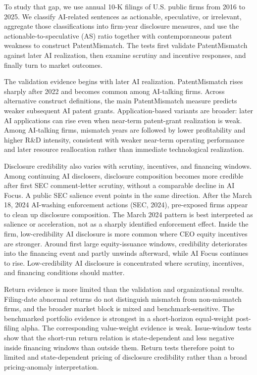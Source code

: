 To study that gap, we use annual 10-K filings of U.S. public firms from 2016 to 2025. We classify AI-related sentences as actionable, speculative, or irrelevant, aggregate those classifications into firm-year disclosure measures, and use the actionable-to-speculative (AS) ratio together with contemporaneous patent weakness to construct PatentMismatch. The tests first validate PatentMismatch against later AI realization, then examine scrutiny and incentive responses, and finally turn to market outcomes.

The validation evidence begins with later AI realization. PatentMismatch rises sharply after 2022 and becomes common among AI-talking firms. Across alternative construct definitions, the main PatentMismatch measure predicts weaker subsequent AI patent grants. Application-based variants are broader: later AI applications can rise even when near-term patent-grant realization is weak. Among AI-talking firms, mismatch years are followed by lower profitability and higher R\&D intensity, consistent with weaker near-term operating performance and later resource reallocation rather than immediate technological realization.

Disclosure credibility also varies with scrutiny, incentives, and financing windows. Among continuing AI disclosers, disclosure composition becomes more credible after first SEC comment-letter scrutiny, without a comparable decline in AI Focus. A public SEC salience event points in the same direction. After the March 18, 2024 AI-washing enforcement actions (SEC, 2024), pre-exposed firms appear to clean up disclosure composition. The March 2024 pattern is best interpreted as salience or acceleration, not as a sharply identified enforcement effect. Inside the firm, low-credibility AI disclosure is more common where CEO equity incentives are stronger. Around first large equity-issuance windows, credibility deteriorates into the financing event and partly unwinds afterward, while AI Focus continues to rise. Low-credibility AI disclosure is concentrated where scrutiny, incentives, and financing conditions should matter.

Return evidence is more limited than the validation and organizational results. Filing-date abnormal returns do not distinguish mismatch from non-mismatch firms, and the broader market block is mixed and benchmark-sensitive. The benchmarked portfolio evidence is strongest in a short-horizon equal-weight post-filing alpha. The corresponding value-weight evidence is weak. Issue-window tests show that the short-run return relation is state-dependent and less negative inside financing windows than outside them. Return tests therefore point to limited and state-dependent pricing of disclosure credibility rather than a broad pricing-anomaly interpretation.

